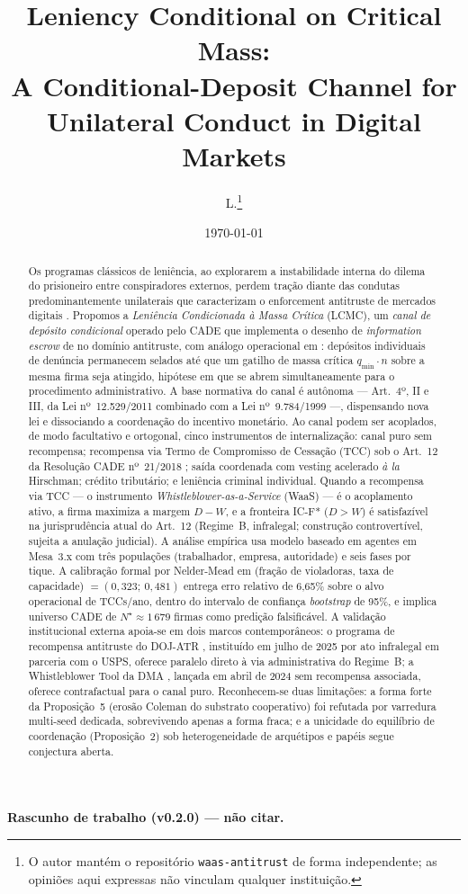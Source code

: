 \documentclass[12pt,a4paper]{article}
\title{Leniency Conditional on Critical Mass:\\
A Conditional-Deposit Channel for Unilateral Conduct in Digital Markets}
\author{L.\thanks{O autor mantém o repositório \texttt{waas-antitrust} de forma independente; as opiniões aqui expressas não vinculam qualquer instituição.}}
\date{\today}
\begin{document}
\maketitle

\begin{center}\textbf{Rascunho de trabalho (v0.2.0) --- não citar.}\end{center}

\begin{abstract}
Os programas clássicos de leniência, ao explorarem a instabilidade interna do dilema do prisioneiro entre conspiradores externos, perdem tração diante das condutas predominantemente unilaterais que caracterizam o enforcement antitruste de mercados digitais \citep{cremer2019competition}. Propomos a \emph{Leniência Condicionada à Massa Crítica} (LCMC), um \emph{canal de depósito condicional} operado pelo CADE que implementa o desenho de \emph{information escrow} de \citet{ayres2012information} no domínio antitruste, com análogo operacional em \citet{callisto}: depósitos individuais de denúncia permanecem selados até que um gatilho de massa crítica $q_{\min}\cdot n$ sobre a mesma firma seja atingido, hipótese em que se abrem simultaneamente para o procedimento administrativo. A base normativa do canal é autônoma --- Art.~4º, II e III, da Lei nº~12.529/2011 \citep{lei12529} combinado com a Lei nº~9.784/1999 \citep{lei9784} ---, dispensando nova lei e dissociando a coordenação do incentivo monetário. Ao canal podem ser acoplados, de modo facultativo e ortogonal, cinco instrumentos de internalização: canal puro sem recompensa; recompensa via Termo de Compromisso de Cessação (TCC) sob o Art.~12 da Resolução CADE nº~21/2018 \citep{res21cade}; saída coordenada com vesting acelerado \emph{à la} Hirschman; crédito tributário; e leniência criminal individual. Quando a recompensa via TCC --- o instrumento \emph{Whistleblower-as-a-Service} (WaaS) --- é o acoplamento ativo, a firma maximiza a margem $D - W$, e a fronteira IC-F* ($D > W$) é satisfazível na jurisprudência atual do Art.~12 (Regime~B, infralegal; construção controvertível, sujeita a anulação judicial). A análise empírica usa modelo baseado em agentes em Mesa~3.x com três populações (trabalhador, empresa, autoridade) e seis fases por tique. A calibração formal por Nelder-Mead em (fração de violadoras, taxa de capacidade) $=(0{,}323;\ 0{,}481)$ entrega erro relativo de 6,65\% sobre o alvo operacional de TCCs/ano, dentro do intervalo de confiança \emph{bootstrap} de 95\%, e implica universo CADE de $N^\star \approx 1\,679$ firmas como predição falsificável. A validação institucional externa apoia-se em dois marcos contemporâneos: o programa de recompensa antitruste do DOJ-ATR \citep{dojatr2025}, instituído em julho de 2025 por ato infralegal em parceria com o USPS, oferece paralelo direto à via administrativa do Regime~B; a Whistleblower Tool da DMA \citep{dmatool2024}, lançada em abril de 2024 sem recompensa associada, oferece contrafactual para o canal puro. Reconhecem-se duas limitações: a forma forte da Proposição~5 (erosão Coleman do substrato cooperativo) foi refutada por varredura multi-seed dedicada, sobrevivendo apenas a forma fraca; e a unicidade do equilíbrio de coordenação (Proposição~2) sob heterogeneidade de arquétipos e papéis segue conjectura aberta.

\end{abstract}
\end{document}
